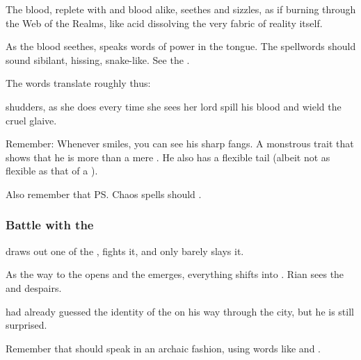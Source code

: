 The \draconian{} blood, replete with \ophidian{} and \xzaishannic{} blood alike, seethes and sizzles, as if burning through the Web of the Realms, like acid dissolving the very fabric of reality itself. 

As the blood seethes, \Ishnaruchaefir{} speaks words of power in the \Draconic{} tongue. The \Draconic{} spellwords should sound sibilant, hissing, snake-like. See the . 

The words translate roughly thus:


\Criseis{} shudders, as she does every time she sees her lord spill his blood and wield the cruel glaive. 

Remember: Whenever \Ishnaruchaefir{} smiles, you can see his sharp fangs. A monstrous trait that shows that he is more than a mere \scatha. He also has a flexible tail (albeit not as flexible as that of a ).

Also remember that \ps{\Ishnaruchaefir} Chaos spells should . 







\subsubsection{Battle with the \noggyal}
\Ishnaruchaefir{} draws out one of the \noggyaleth, fights it, and only barely slays it. 

As the way to the \Nyx{} opens and the \noggyal{} emerges, everything shifts into \Nyx. Rian sees the  and despairs.

\Ishnaruchaefir{} had already guessed the identity of the \noggyal{} on his way through the city, but he is still surprised. 

Remember that \Ishnaruchaefir{} should speak in an archaic fashion, using words like  and .

